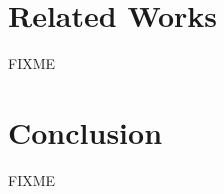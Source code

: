 \documentclass{acm_proc_article-sp}
\begin{document}

\section{Related Works}
FIXME

\section{Conclusion}
FIXME



\end{document}
